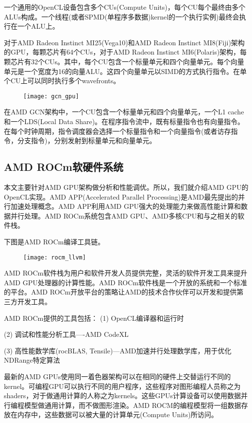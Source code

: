 一个通用的OpenCL设备包含多个CUs(Compute Units)，每个CU每个最终由多个ALUs构成。一个线程(或者SPMD(单程序多数据)kernel的一个执行实例)最终会执行在一个ALU上。

对于AMD Radeon Instinct MI25(Vega10)和AMD Radeon Instinct MI8(Fiji)架构的GPU，每颗芯片有64个CUs，对于AMD Radeon Instinct MI6(Polaris)架构，每颗芯片有32个CUs。其中，每个CU包含一个标量单元和四个向量单元。每个向量单元是一个宽度为16的向量ALU。这四个向量单元以SIMD的方式执行指令。在单个CU上可以同时执行多个wavefronts。
\begin{figure}[htbp]
	\centering
	\texttt{[image: gcn\_gpu]}
	\label{fig:gcn_gpu}
\end{figure}
在AMD GCN架构中，一个CU包含一个标量单元和四个向量单元，一个L1 cache和一个LDS(Local Data Share)。在程序指令流中，既有标量指令也有向量指令。在每个时钟周期，指令调度器会选择一个标量指令和一个向量指令(或者访存指令，分支指令)，分别发射到标量单元和向量单元。


\subsection{AMD ROCm软硬件系统}
本文主要针对AMD GPU架构做分析和性能调优。所以，我们就介绍AMD GPU的OpenCL实现。AMD APP(Accelerated Parallel Processing)是AMD最先提出的并行加速处理概念。AMD APP利用AMD GPU强大的处理能力来做高性能计算和数据并行处理。AMD ROCm系统包含AMD GPU、AMD多核CPU和与之相关的软件栈。

下图是AMD ROCm编译工具链。
\begin{figure}[htbp]
	\centering
	\texttt{[image: rocm\_llvm]}
	\label{fig:rocm_llvm}
\end{figure}

AMD ROCm软件栈为用户和软件开发人员提供完整，灵活的软件开发工具来提升AMD GPU处理器的计算性能。AMD ROCm软件栈是一个开放的系统和一个标准的平台。AMD ROCm开放平台的策略让AMD的技术合作伙伴可以开发和提供第三方开发工具。

AMD ROCm提供的工具包括：
(1)  OpenCL编译器和运行时

(2)  调试和性能分析工具----AMD CodeXL

(3)  高性能数学库(rocBLAS, Tensile)---AMD加速并行处理数学库，用于优化NDRange特定算法

最新的AMD GPUs使用同一着色器架构可以在相同的硬件上交替运行不同的kernel。可编程GPU可以执行不同的用户程序，这些程序对图形编程人员称之为shaders，对于做通用计算的人称之为kernels。这些GPUs计算设备可以使用数据并行编程模型做通用计算，而不做图形渲染。AMD ROCM的编程模型将一组数据存放在内存中，这些数据可以被大量的计算单元(Compute Units)所访问。

